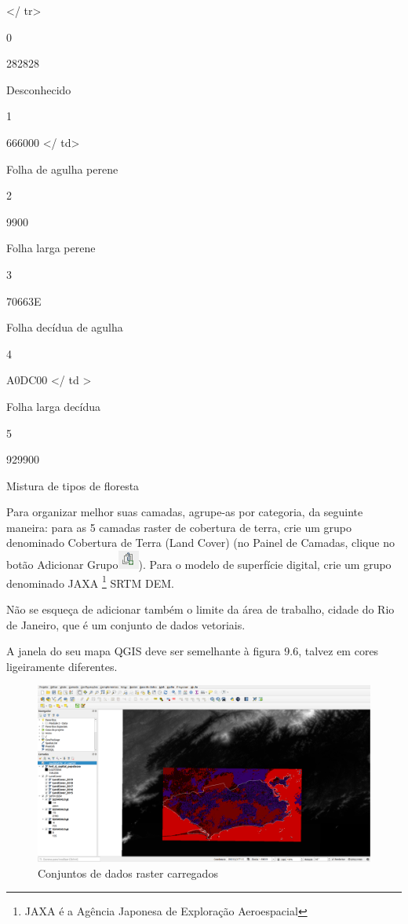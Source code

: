 \documentclass[
]{book}
\begin{document}
\textless/ tr\textgreater{}

0

282828

Desconhecido

1

666000
\textless/ td\textgreater{}

Folha de agulha perene

2

9900

Folha larga perene

3

70663E

Folha decídua de agulha

4

A0DC00
\textless/ td \textgreater{}

Folha larga decídua

5

929900

Mistura de tipos de floresta

Para organizar melhor suas camadas, agrupe-as por categoria, da seguinte maneira: para as 5 camadas raster de cobertura de terra, crie um grupo denominado Cobertura de Terra (Land Cover) (no Painel de Camadas, clique no botão Adicionar Grupo\includegraphics{media/modulo9/add-group-btn.png}). Para o modelo de superfície digital, crie um grupo denominado JAXA \footnote{JAXA é a Agência Japonesa de Exploração Aeroespacial} SRTM DEM.

Não se esqueça de adicionar também o limite da área de trabalho, cidade do Rio de Janeiro, que é um conjunto de dados vetoriais.

A janela do seu mapa QGIS deve ser semelhante à figura 9.6, talvez em cores ligeiramente diferentes.

\begin{figure}
\centering
\includegraphics{media/modulo9/fig96.png}
\caption{Conjuntos de dados raster carregados}
\end{figure}
\end{document}
